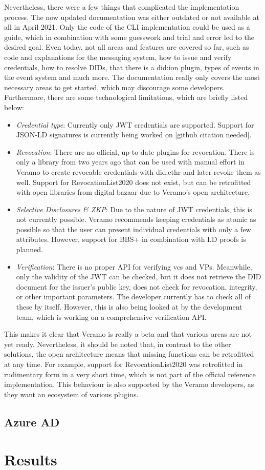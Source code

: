     Nevertheless, there were a few things that complicated the implementation process. The now updated documentation was either outdated or not available at all in April 2021. Only the code of the CLI implementation could be used as a guide, which in combination with some guesswork and trial and error led to the desired goal. Even today, not all areas and features are covered so far, such as code and explanations for the messaging system, how to issue and verify credentials, how to resolve \acp{DID}, that there is a did:ion plugin, types of events in the event system and much more. The documentation really only covers the most necessary areas to get started, which may discourage some developers. Furthermore, there are some technological limitations, which are briefly listed below:
    
\begin{itemize}
    \item \textit{Credential type}: Currently only JWT credentials are supported. Support for JSON-LD signatures is currently being worked on [github citation needed].
    \item \textit{Revocation}: There are no official, up-to-date plugins for revocation. There is only a library from two years ago that can be used with manual effort in Veramo to create revocable credentials with did:ethr and later revoke them as well. Support for RevocationList2020 does not exist, but can be retrofitted with open libraries from digital bazaar due to Veramo's open architecture.
    \item \textit{Selective Disclosures \& ZKP}: Due to the nature of JWT credentials, this is not currently possible. Veramo recommends keeping credentials as atomic as possible so that the user can present individual credentials with only a few attributes. However, support for BBS+ in combination with LD proofs is planned.
    \item \textit{Verification}: There is no proper API for verifying \acp{vc} and \acp{VP}. Meanwhile, only the validity of the JWT can be checked, but it does not retrieve the \ac{DID} document for the issuer's public key, does not check for revocation, integrity, or other important parameters. The developer currently has to check all of these by itself. However, this is also being looked at by the development team, which is working on a comprehensive verification API.
\end{itemize}

    This makes it clear that Veramo is really a beta and that various areas are not yet ready. Nevertheless, it should be noted that, in contrast to the other solutions, the open architecture means that missing functions can be retrofitted at any time. For example, support for RevocationList2020 was retrofitted in rudimentary form in a very short time, which is not part of the official reference implementation. This behaviour is also supported by the Veramo developers, as they want an ecosystem of various plugins.

    
    
    
    
    
    \subsection{Azure AD}\label{subsection: azure}
    \section{Results}\label{section: ri-results}